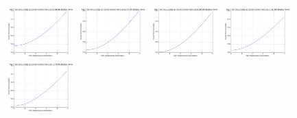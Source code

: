 \includegraphics[width=0.2\textwidth]{img/center_center_trip_time_vs_displacement_0_radian_ramp}%
\includegraphics[width=0.2\textwidth]{img/center_center_trip_time_vs_displacement_pi_6_radian_ramp}%
\includegraphics[width=0.2\textwidth]{img/center_center_trip_time_vs_displacement_pi_4_radian_ramp}%
\includegraphics[width=0.2\textwidth]{img/center_center_trip_time_vs_displacement_pi_3_radian_ramp}%
\includegraphics[width=0.2\textwidth]{img/center_center_trip_time_vs_displacement_pi_2_radian_ramp}%